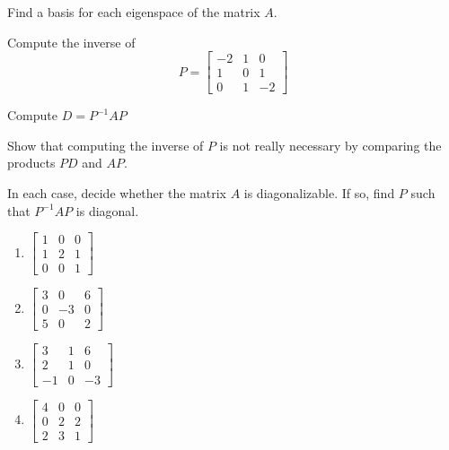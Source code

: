 \documentclass{ximera}
\begin{document}
\begin{problem}\label{prob:ex:diagonalizematrix2}
Find a basis for each eigenspace of the matrix $A$.
\end{problem}

\begin{problem}\label{prob:ex:diagonalizematrix3}
Compute the inverse of \begin{equation*}
P=
\begin{bmatrix}
-2 & 1 & 0 \\
1 & 0 & 1 \\
0 & 1 & -2
\end{bmatrix}
\end{equation*}
\end{problem}

\begin{problem}\label{prob:ex:diagonalizematrix5}
Compute $D=P^{-1}AP$
\end{problem}

\begin{problem}\label{prob:ex:diagonalizematrix4}
Show that computing the inverse of $P$ is not really necessary by comparing the products  $PD$ and $AP$.
\end{problem}
 
\begin{problem}\label{prb:diagonalizable}
In each case, decide whether the matrix $A$ is diagonalizable. If so, find $P$ such that $P^{-1}AP$ is diagonal.

\begin{enumerate}
\item $\begin{bmatrix}
1 & 0 & 0 \\
1 & 2 & 1 \\
0 & 0 & 1
\end{bmatrix}$
\item $\begin{bmatrix}
3 &  0 & 6 \\
0 & -3 & 0 \\
5 &  0 & 2
\end{bmatrix}$
\item $\begin{bmatrix}
 3 &  1 &  6 \\
 2 &  1 &  0 \\
-1 &  0 & -3
\end{bmatrix}$
\item $\begin{bmatrix}
4 & 0 & 0 \\
0 & 2 & 2 \\
2 & 3 & 1
\end{bmatrix}$
\end{enumerate}
\end{problem}
\end{document}
